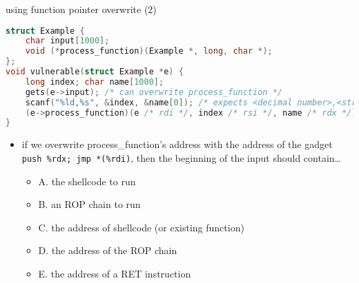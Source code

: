 \begin{frame}[fragile,label=useFPtrOverwrite2]{using function pointer overwrite (2)}
\begin{lstlisting}[language=C,style=script]
struct Example {
    char input[1000];
    void (*process_function)(Example *, long, char *);
};
void vulnerable(struct Example *e) {
    long index; char name[1000];
    gets(e->input); /* can overwrite process_function */
    scanf("%ld,%s", &index, &name[0]); /* expects <decimal number>,<string> */
    (e->process_function)(e /* rdi */, index /* rsi */, name /* rdx */);
}
\end{lstlisting}
\begin{itemize}
\item \small if we overwrite process\_function's address with the address of the gadget
    \texttt{push \%rdx; jmp *(\%rdi)}, then the beginning of the input should contain\ldots \\
    \begin{itemize}
    \item A. the shellcode to run
    \item B. an ROP chain to run
    \item C. the address of shellcode (or existing function) 
    \item D. the address of the ROP chain 
    \item E. the address of a RET instruction
    \end{itemize}
\end{itemize}
\end{frame}

